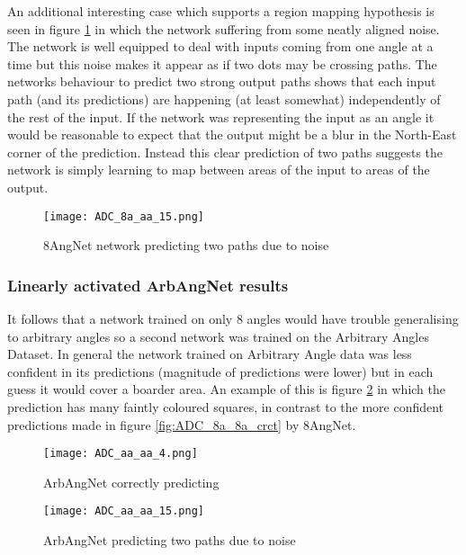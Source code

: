 An additional interesting case which supports a region mapping hypothesis is seen in figure \ref{fig:ADC_8aNoaa_special} in which the network suffering from some neatly aligned noise. 
The network is well equipped to deal with inputs coming from one angle at a time but this noise makes it appear as if two dots may be crossing paths. 
The networks behaviour to predict two strong output paths shows that each input path (and its predictions) are happening (at least somewhat) independently of the rest of the input.
If the network was representing the input as an angle it would be reasonable to expect that the output might be a blur in the North-East corner of the prediction.  
Instead this clear prediction of two paths suggests the network is simply learning to map between areas of the input to areas of the output. 

\begin{figure}
    \centering
    \texttt{[image: ADC\_8a\_aa\_15.png]}
    \caption{8AngNet network predicting two paths due to noise}
    \label{fig:ADC_8aNoaa_special}
\end{figure}


\subsubsection{Linearly activated ArbAngNet results}
It follows that a network trained on only 8 angles would have trouble generalising to arbitrary angles so a second network was trained on the Arbitrary Angles Dataset. 
In general the network trained on Arbitrary Angle data was less confident in its predictions (magnitude of predictions were lower) but in each guess it would cover a boarder area. 
An example of this is figure \ref{fig:ADC_aaaa_crct} in which the prediction has many faintly coloured squares, in contrast to the more confident predictions made in figure \ref{fig:ADC_8a_8a_crct} by 8AngNet.

\begin{figure}[h]
    \centering
    \texttt{[image: ADC\_aa\_aa\_4.png]}
    \caption{ArbAngNet correctly predicting}
    \label{fig:ADC_aaaa_crct}
\end{figure}


\begin{figure}[h]
    \centering
    \texttt{[image: ADC\_aa\_aa\_15.png]}
    \caption{ArbAngNet predicting two paths due to noise}
    \label{fig:ADC_aaaa_twopath}
\end{figure}

